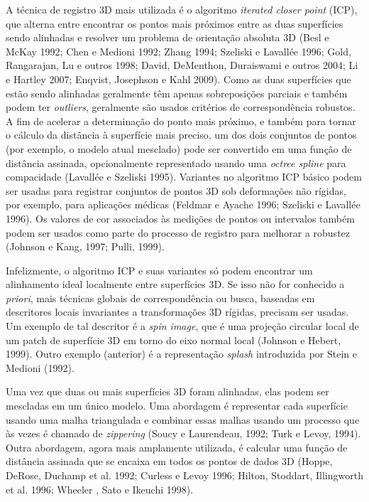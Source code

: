 \documentclass{article}
\begin{document}
A técnica de registro 3D mais utilizada é o algoritmo \textit{iterated closer point} (ICP), que alterna entre encontrar os pontos mais próximos entre as duas superfícies sendo alinhadas e resolver um problema de orientação absoluta 3D (Besl e McKay 1992; Chen e Medioni 1992; Zhang 1994; Szeliski e Lavallée 1996; Gold, Rangarajan, Lu e outros 1998; David, DeMenthon, Duraiswami e outros 2004; Li e Hartley 2007; Enqvist, Josephson e Kahl 2009). Como as duas superfícies que estão sendo alinhadas geralmente têm apenas sobreposições parciais e também podem ter \textit{outliers}, geralmente são usados critérios de correspondência robustos. A fim de acelerar a determinação do ponto mais próximo, e também para tornar o cálculo da distância à superfície mais preciso, um dos dois conjuntos de pontos (por exemplo, o modelo atual mesclado) pode ser convertido em uma função de distância assinada, opcionalmente representado usando uma \textit{octree spline} para compacidade (Lavallée e Szeliski 1995).
Variantes no algoritmo ICP básico podem ser usadas para registrar conjuntos de pontos 3D sob deformações não rígidas, por exemplo, para aplicações médicas (Feldmar e Ayache 1996; Szeliski e Lavallée 1996). Os valores de cor associados às medições de pontos ou intervalos também podem ser usados como parte do processo de registro para melhorar a robustez (Johnson e Kang, 1997; Pulli, 1999).

Infelizmente, o algoritmo ICP e suas variantes só podem encontrar um alinhamento ideal localmente entre superfícies 3D. Se isso não for conhecido a \textit{priori}, mais técnicas globais de correspondência ou busca, baseadas em descritores locais invariantes a transformações 3D rígidas, precisam ser usadas. Um exemplo de tal descritor é a \textit{spin image}, que é uma projeção circular local de um patch de superfície 3D em torno do eixo normal local (Johnson e Hebert, 1999). Outro exemplo (anterior) é a representação \textit{splash} introduzida por Stein e Medioni (1992).

Uma vez que duas ou mais superfícies 3D foram alinhadas, elas podem ser mescladas em um único modelo. Uma abordagem é representar cada superfície usando uma malha triangulada e combinar essas malhas usando um processo que às vezes é chamado de \textit{zippering} (Soucy e Laurendeau, 1992; Turk e Levoy, 1994). Outra abordagem, agora mais amplamente utilizada, é calcular uma função de distância assinada que se encaixa em todos os pontos de dados 3D (Hoppe, DeRose, Duchamp et al. 1992; Curless e Levoy 1996; Hilton, Stoddart, Illingworth et al. 1996; Wheeler , Sato e Ikeuchi 1998).
\end{document}
